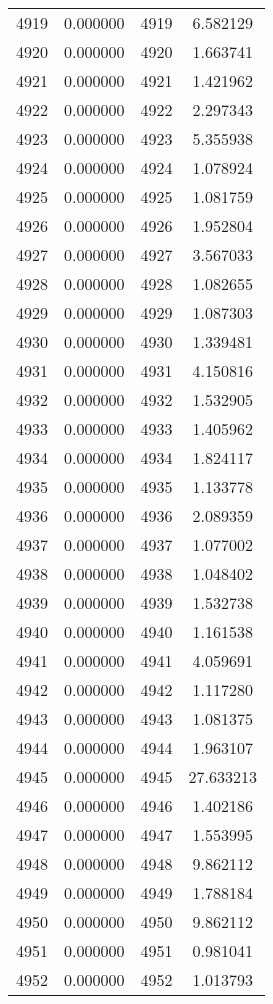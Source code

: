 \documentclass[12pt]{article}
\begin{document}
\begin{longtable}{@{}cccc@{}}
4919 & 0.000000 & 4919 & 6.582129 \\
4920 & 0.000000 & 4920 & 1.663741 \\
4921 & 0.000000 & 4921 & 1.421962 \\
4922 & 0.000000 & 4922 & 2.297343 \\
4923 & 0.000000 & 4923 & 5.355938 \\
4924 & 0.000000 & 4924 & 1.078924 \\
4925 & 0.000000 & 4925 & 1.081759 \\
4926 & 0.000000 & 4926 & 1.952804 \\
4927 & 0.000000 & 4927 & 3.567033 \\
4928 & 0.000000 & 4928 & 1.082655 \\
4929 & 0.000000 & 4929 & 1.087303 \\
4930 & 0.000000 & 4930 & 1.339481 \\
4931 & 0.000000 & 4931 & 4.150816 \\
4932 & 0.000000 & 4932 & 1.532905 \\
4933 & 0.000000 & 4933 & 1.405962 \\
4934 & 0.000000 & 4934 & 1.824117 \\
4935 & 0.000000 & 4935 & 1.133778 \\
4936 & 0.000000 & 4936 & 2.089359 \\
4937 & 0.000000 & 4937 & 1.077002 \\
4938 & 0.000000 & 4938 & 1.048402 \\
4939 & 0.000000 & 4939 & 1.532738 \\
4940 & 0.000000 & 4940 & 1.161538 \\
4941 & 0.000000 & 4941 & 4.059691 \\
4942 & 0.000000 & 4942 & 1.117280 \\
4943 & 0.000000 & 4943 & 1.081375 \\
4944 & 0.000000 & 4944 & 1.963107 \\
4945 & 0.000000 & 4945 & 27.633213 \\
4946 & 0.000000 & 4946 & 1.402186 \\
4947 & 0.000000 & 4947 & 1.553995 \\
4948 & 0.000000 & 4948 & 9.862112 \\
4949 & 0.000000 & 4949 & 1.788184 \\
4950 & 0.000000 & 4950 & 9.862112 \\
4951 & 0.000000 & 4951 & 0.981041 \\
4952 & 0.000000 & 4952 & 1.013793 \\

\end{longtable}
\end{document}

